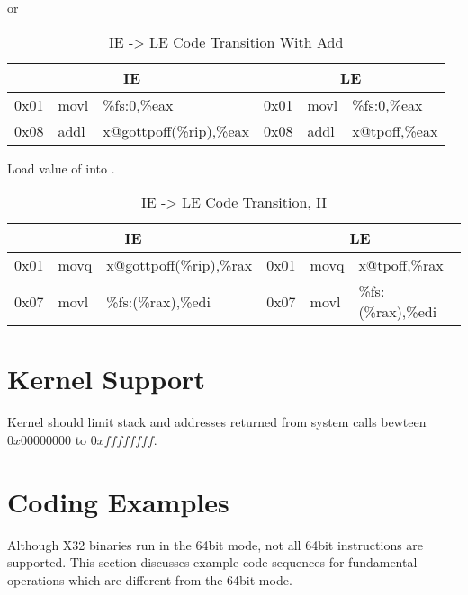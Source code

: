 \begin{description}
or

\begin{table}[H]
\Hrule
\caption{IE -> LE Code Transition With Add}
\begin{center}
\code\small{
\begin{tabular}{lll|lll}
\multicolumn{3}{c}{IE} & \multicolumn{3}{c}{LE} \\
\hline
0x01 & movl & \%fs:0,\%eax		& 0x01 & movl & \%fs:0,\%eax \\
0x08 & addl & x@gottpoff(\%rip),\%eax	& 0x08 & addl & x@tpoff,\%eax \\
\end{tabular}
}
\end{center}
\Hrule
\end{table}

\item[\textindex{Initial Exec To Local Exec, II}]
  Load value of  into .

\begin{table}[H]
\Hrule
\caption{IE -> LE Code Transition, II}
\begin{center}
\code\small{
\begin{tabular}{lll|lll}
\multicolumn{3}{c}{IE} & \multicolumn{3}{c}{LE} \\
\hline
0x01 & movq & x@gottpoff(\%rip),\%rax	& 0x01 & movq & x@tpoff,\%rax \\
0x07 & movl & \%fs:(\%rax),\%edi	& 0x07 & movl & \%fs:(\%rax),\%edi \\
\end{tabular}
}
\end{center}
\Hrule
\end{table}

\end{description}

\section{Kernel Support}
Kernel should limit stack and addresses returned from system calls
bewteen $0x00000000$ to $0xffffffff$.

\section{Coding Examples}

Although X32 binaries run in the 64bit mode, not all 64bit instructions
are supported. This section discusses example code sequences for
fundamental operations which are different from the 64bit mode.

